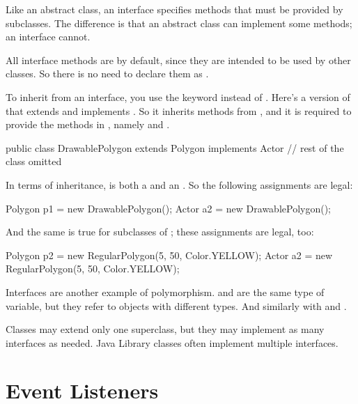 Like an abstract class, an interface specifies methods that must be provided by subclasses.
The difference is that an abstract class can implement some methods; an interface cannot.

All interface methods are  by default, since they are intended to be used by other classes.
So there is no need to declare them as .

To inherit from an interface, you use the keyword  instead of .
Here's a version of  that extends  and implements .
So it inherits methods from , and it is required to provide the methods in , namely  and .

\begin{code}
public class DrawablePolygon extends Polygon implements Actor {
    // rest of the class omitted
}
\end{code}

In terms of inheritance,  is both a  and an .
So the following assignments are legal:

\begin{code}
Polygon p1 = new DrawablePolygon();
Actor a2 = new DrawablePolygon();
\end{code}

And the same is true for subclasses of ; these assignments are legal, too:

\begin{code}
Polygon p2 = new RegularPolygon(5, 50, Color.YELLOW);
Actor a2 = new RegularPolygon(5, 50, Color.YELLOW);
\end{code}


Interfaces are another example of polymorphism.
 and  are the same type of variable, but they refer to objects with different types.
And similarly with  and .


Classes may extend only one superclass, but they may implement as many interfaces as needed.
Java Library classes often implement multiple interfaces.


\section{Event Listeners}

